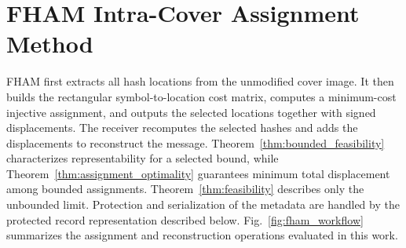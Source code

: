 \documentclass[preprint,12pt]{elsarticle}
\theoremstyle{plain}
\begin{document}
\section{FHAM Intra-Cover Assignment Method}
\label{sec:methodology}
FHAM first extracts all hash locations from the unmodified cover image. It then
builds the rectangular symbol-to-location cost matrix, computes a minimum-cost
injective assignment, and outputs the selected locations together with signed
displacements. The receiver recomputes the selected hashes and adds the
displacements to reconstruct the message. Theorem~\ref{thm:bounded_feasibility}
characterizes representability for a selected bound, while
Theorem~\ref{thm:assignment_optimality} guarantees minimum total displacement
among bounded assignments. Theorem~\ref{thm:feasibility} describes only the
unbounded limit. Protection and serialization of the metadata are handled by
the protected record representation described below.
Fig.~\ref{fig:fham_workflow} summarizes the assignment and reconstruction
operations evaluated in this work.
\end{document}
